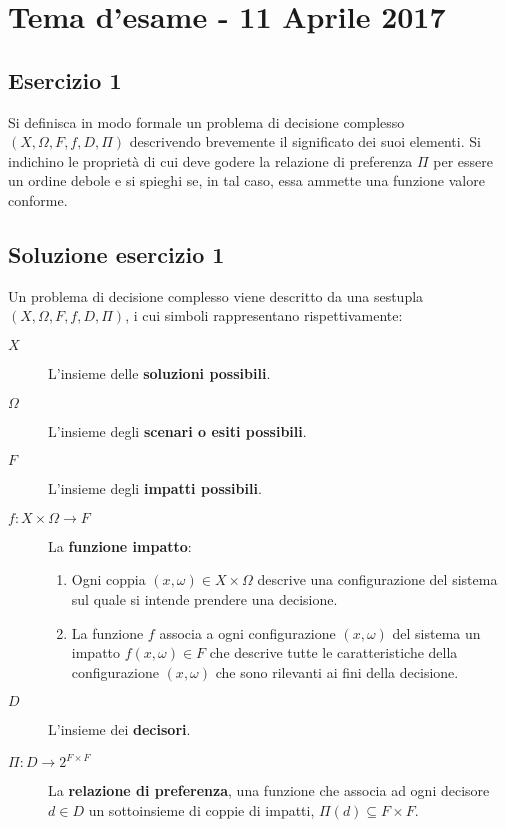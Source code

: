 \documentclass[\main/main.tex]{subfiles}
\begin{document}
\section{Tema d'esame - 11 Aprile 2017}

\subsection{Esercizio 1}
Si definisca in modo formale un problema di decisione complesso $(X, \Omega, F, f, D, \Pi)$ descrivendo brevemente il significato dei suoi elementi. Si indichino le proprietà di cui deve godere la relazione di preferenza $\Pi$ per essere un ordine debole e si spieghi se, in tal caso, essa ammette una funzione valore conforme.

\subsection{Soluzione esercizio 1}
Un problema di decisione complesso viene descritto da una sestupla $(X, \Omega, F, f, D, \Pi)$, i cui simboli rappresentano rispettivamente:

\begin{description}
	\item [$X$] L'insieme delle \textbf{soluzioni possibili}.
	\item [$\Omega$] L'insieme degli \textbf{scenari o esiti possibili}.
	\item [$F$] L'insieme degli \textbf{impatti possibili}.
	\item [$f: X \times \Omega  \rightarrow F$] La \textbf{funzione impatto}:
	      \begin{enumerate}
		      \item Ogni coppia $(x, \omega) \in X \times \Omega$ descrive una configurazione del sistema sul quale si intende prendere una decisione.
		      \item La funzione $f$ associa a ogni configurazione $(x, \omega)$ del sistema un impatto $f(x, \omega) \in F$ che descrive tutte le caratteristiche della configurazione $(x, \omega)$ che sono rilevanti ai fini della decisione.
	      \end{enumerate}
	\item [$D$] L'insieme dei \textbf{decisori}.
	\item [$\Pi: D \rightarrow 2^{F\times F}$] La \textbf{relazione di preferenza}, una funzione che associa ad ogni decisore $d \in D$ un sottoinsieme di coppie di impatti, $\Pi(d) \subseteq F \times F$.
\end{description}
\end{document}
